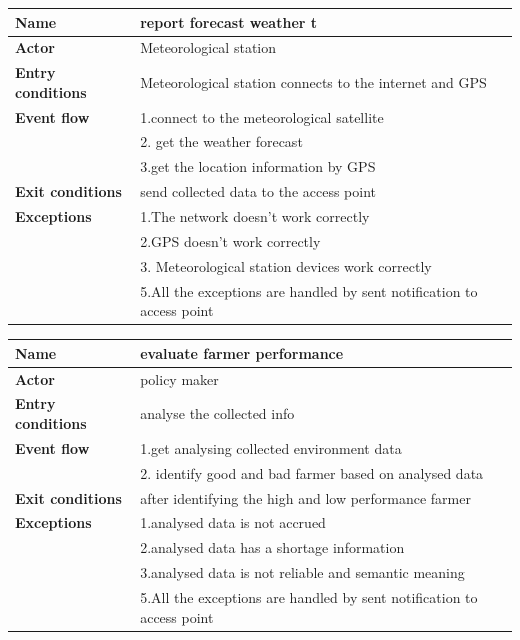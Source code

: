\begin{table}[H]
\begin{tabular}{|l|l|}
\hline
\normalsize	
\textbf{Name} & report forecast weather t\\\hline
\textbf{Actor} & Meteorological station\\\hline
\textbf{Entry conditions} & Meteorological station connects to the internet and GPS \\\hline
\textbf{Event flow} & 1.connect to the meteorological satellite \\&
2. get the weather forecast\\&
3.get the location information by GPS\\\hline
\textbf{Exit conditions} & send collected data to the access point \\\hline
\textbf{Exceptions }& 
1.The network doesn't work correctly  \\&
2.GPS doesn't work correctly \\&
3. Meteorological station devices work correctly\\&
5.All the exceptions are handled by sent notification to access point
\\\hline
\end{tabular}
\end{table}

\begin{table}[H]
\begin{tabular}{|l|l|}
\hline
\normalsize	
\textbf{Name} & evaluate farmer performance\\\hline
\textbf{Actor} & policy maker\\\hline
\textbf{Entry conditions} & analyse the collected info   \\\hline
\textbf{Event flow} & 1.get analysing collected environment data \\&
2. identify good and bad farmer based on analysed data\\\hline
\textbf{Exit conditions} & after identifying the high and  low performance farmer  \\\hline
\textbf{Exceptions }& 
1.analysed data is not accrued\\&
2.analysed data  has a shortage information \\&
3.analysed data is not reliable and semantic meaning  \\&
5.All the exceptions are handled by sent notification to access point
\\\hline
\end{tabular}
\end{table}

